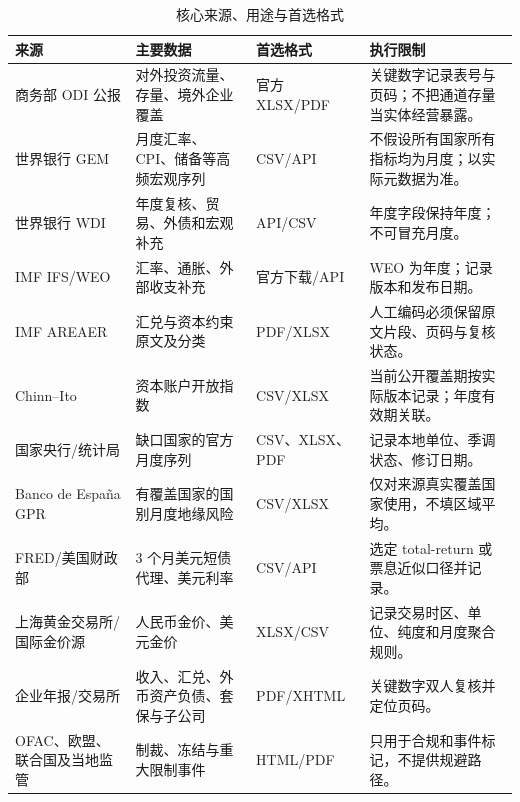 \documentclass[UTF8,fontset=windows,12pt,openany]{ctexbook}
\begin{document}
\begin{longtable}{p{3.0cm}p{3.2cm}p{3.0cm}p{3.9cm}}
\caption{核心来源、用途与首选格式}\label{tab:source-map}\\
\toprule
\textbf{来源} & \textbf{主要数据} & \textbf{首选格式} & \textbf{执行限制}\\
\midrule
商务部 ODI 公报 & 对外投资流量、存量、境外企业覆盖 & 官方 XLSX/PDF & 关键数字记录表号与页码；不把通道存量当实体经营暴露。\\
世界银行 GEM & 月度汇率、CPI、储备等高频宏观序列 & CSV/API & 不假设所有国家所有指标均为月度；以实际元数据为准。\\
世界银行 WDI & 年度复核、贸易、外债和宏观补充 & API/CSV & 年度字段保持年度；不可冒充月度。\\
IMF IFS/WEO & 汇率、通胀、外部收支补充 & 官方下载/API & WEO 为年度；记录版本和发布日期。\\
IMF AREAER & 汇兑与资本约束原文及分类 & PDF/XLSX & 人工编码必须保留原文片段、页码与复核状态。\\
Chinn--Ito & 资本账户开放指数 & CSV/XLSX & 当前公开覆盖期按实际版本记录；年度有效期关联。\\
国家央行/统计局 & 缺口国家的官方月度序列 & CSV、XLSX、PDF & 记录本地单位、季调状态、修订日期。\\
Banco de España GPR & 有覆盖国家的国别月度地缘风险 & CSV/XLSX & 仅对来源真实覆盖国家使用，不填区域平均。\\
FRED/美国财政部 & 3 个月美元短债代理、美元利率 & CSV/API & 选定 total-return 或票息近似口径并记录。\\
上海黄金交易所/国际金价源 & 人民币金价、美元金价 & XLSX/CSV & 记录交易时区、单位、纯度和月度聚合规则。\\
企业年报/交易所 & 收入、汇兑、外币资产负债、套保与子公司 & PDF/XHTML & 关键数字双人复核并定位页码。\\
OFAC、欧盟、联合国及当地监管 & 制裁、冻结与重大限制事件 & HTML/PDF & 只用于合规和事件标记，不提供规避路径。\\
\bottomrule
\end{longtable}

\newpage
\end{document}
